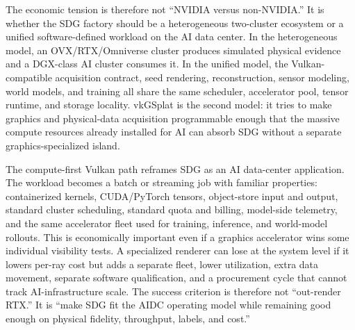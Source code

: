 \documentclass[10pt,journal,onecolumn]{IEEEtran}
\begin{document}
The economic tension is therefore not ``NVIDIA versus non-NVIDIA.'' It is
whether the SDG factory should be a heterogeneous two-cluster ecosystem or a
unified software-defined workload on the AI data center. In the heterogeneous
model, an OVX/RTX/Omniverse cluster produces simulated physical evidence and a
DGX-class AI cluster consumes it. In the unified model, the Vulkan-compatible
acquisition contract, seed rendering, reconstruction, sensor modeling, world
models, and training all share the same scheduler, accelerator pool, tensor
runtime, and storage locality. vkGSplat is the second model: it tries to make
graphics and physical-data acquisition programmable enough that the massive
compute resources already installed for AI can absorb SDG without a separate
graphics-specialized island.

The compute-first Vulkan path reframes SDG as an AI data-center application.
The workload becomes a batch or streaming job with familiar properties:
containerized kernels, CUDA/PyTorch tensors, object-store input and output,
standard cluster scheduling, standard quota and billing, model-side telemetry,
and the same accelerator fleet used for training, inference, and world-model
rollouts. This is economically important even if a graphics accelerator wins
some individual visibility tests. A specialized renderer can lose at the system
level if it lowers per-ray cost but adds a separate fleet, lower utilization,
extra data movement, separate software qualification, and a procurement cycle
that cannot track AI-infrastructure scale. The success criterion is therefore
not ``out-render RTX.'' It is ``make SDG fit the AIDC operating model while
remaining good enough on physical fidelity, throughput, labels, and cost.''
\end{document}
